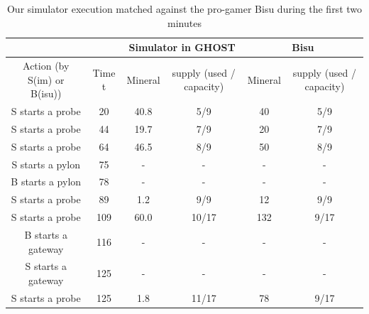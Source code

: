 \documentclass[journal]{IEEEtran}
\newcommand{\ghost}{\textsc{GHOST}\xspace}
\begin{document}
\begin{table}[ht]
  \caption{Our simulator execution matched  against the pro-gamer Bisu
    during the first two minutes}
  \label{tab:korean}
  \centering
  \begin{tabular}{|c|c|c|c|c|c|}
    \cline{3-6}
    \multicolumn{2}{c|}{} & \multicolumn{2}{c|}{Simulator in \ghost} & \multicolumn{2}{c|}{Bisu}\\
    \hline
    Action (by S(im) or B(isu)) & Time t & \multicolumn{1}{c|}{Mineral} & \multicolumn{1}{c|}{supply (used / capacity)} & \multicolumn{1}{c|}{Mineral} & \multicolumn{1}{c|}{supply (used / capacity)}\\
    \hline
    S starts a probe & 20 & 40.8 & 5/9 & 40 & 5/9\\
    S starts a probe & 44 & 19.7 & 7/9 & 20 & 7/9\\
    S starts a probe & 64 & 46.5 & 8/9 & 50 & 8/9\\
    S starts a pylon & 75 & - & - & - & -\\
    B starts a pylon & 78 & - & - & - & -\\
    S starts a probe & 89 & 1.2 & 9/9 & 12 & 9/9\\
    S starts a probe & 109 & 60.0 & 10/17 & 132 & 9/17\\
    B starts a gateway & 116 & - & - & - & -\\
    S starts a gateway & 125 & - & - & - & -\\
    S starts a probe & 125 & 1.8 & 11/17 & 78 & 9/17\\
    \hline
  \end{tabular}
\end{table}
\end{document}
